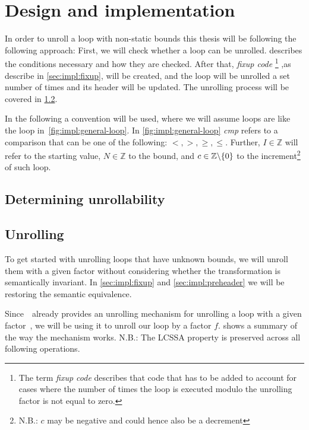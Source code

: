 \chapter{Design and implementation}\label{sec:impl}

In order to unroll a loop with non-static bounds this thesis will be following the following approach:
First, we will check whether a loop can be unrolled.
 describes the conditions necessary and how they are checked.
After that, \textit{fixup code}
\footnote{The term \textit{fixup code} describes that code that has to be added to account for cases where the number of times the loop is executed modulo the unrolling factor is not equal to zero.}
,as describe in \cref{sec:impl:fixup}, will be created, and the loop will be unrolled a set number of times and its header will be updated.
The unrolling process will be covered in \cref{sec:impl:unroll}.

In the following a convention will be used, where we will assume loops are like the loop in~\ref{fig:impl:general-loop}.
In \cref{fig:impl:general-loop} \textit{cmp} refers to a comparison that can be one of the following: $<, >, \geq, \leq$.
Further, $I \in \mathbb{Z}$ will refer to the starting value, $N \in \mathbb{Z}$ to the bound, and $c \in \mathbb{Z} \backslash \{0\}$ \label{sec:impl::def-c} to the increment\footnote{N.B.: $c$ may be negative and could hence also be a decrement} of such loop.



\section{Determining unrollability}\label{sec:impl:unrollability}

\section{Unrolling}\label{sec:impl:unroll}

To get started with unrolling loops that have unknown bounds, we will unroll them with a given factor without considering whether the transformation is semantically invariant.
In \cref{sec:impl:fixup} and \cref{sec:impl:preheader} we will be restoring the semantic equivalence.

Since~\libFIRM~already provides an unrolling mechanism for unrolling a loop with a given factor~\cite{aebi18bachelorarbeit}, we will be using it to unroll our loop by a factor $f$.
 shows a summary of the way the mechanism works.
N.B.: The LCSSA property is preserved across all following operations.

